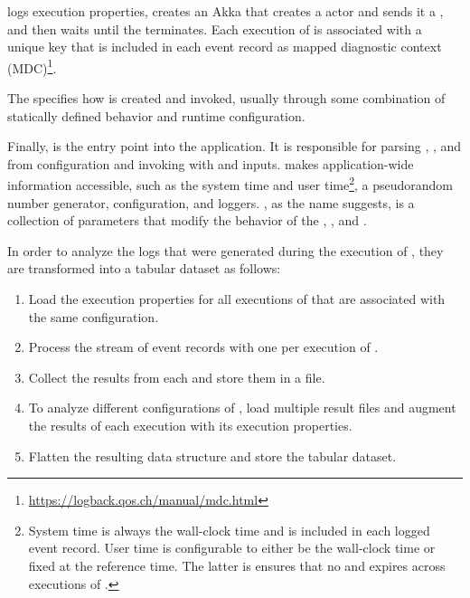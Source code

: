  logs execution properties, creates an Akka  that creates a  actor and sends it a , and then waits until the  terminates. Each execution of  is associated with a unique key that is included in each event record as mapped diagnostic context (MDC)\footnote{\url{https://logback.qos.ch/manual/mdc.html}}.

The  specifies how  is created and invoked, usually through some combination of statically defined behavior and runtime configuration.

Finally,  is the entry point into the application. It is responsible for parsing , , and  from configuration and invoking  with  and  inputs.  makes application-wide information accessible, such as the system time and user time\footnote{System time is always the wall-clock time and is included in each logged event record. User time is configurable to either be the wall-clock time or fixed at the reference time. The latter is ensures that no  and  expires across executions of .}, a pseudorandom number generator,  configuration, and loggers. , as the name suggests, is a collection of parameters that modify the behavior of the , , and .

In order to analyze the logs that were generated during the execution of , they are transformed into a tabular dataset as follows:
\begin{enumerate}
  \item Load the execution properties for all executions of  that are associated with the same configuration.
  \item Process the stream of event records with one  per execution of .
  \item Collect the results from each  and store them in a file.
  \item To analyze different configurations of , load multiple result files and augment the results of each  execution with its execution properties.
  \item Flatten the resulting data structure and store the tabular dataset.
\end{enumerate}


